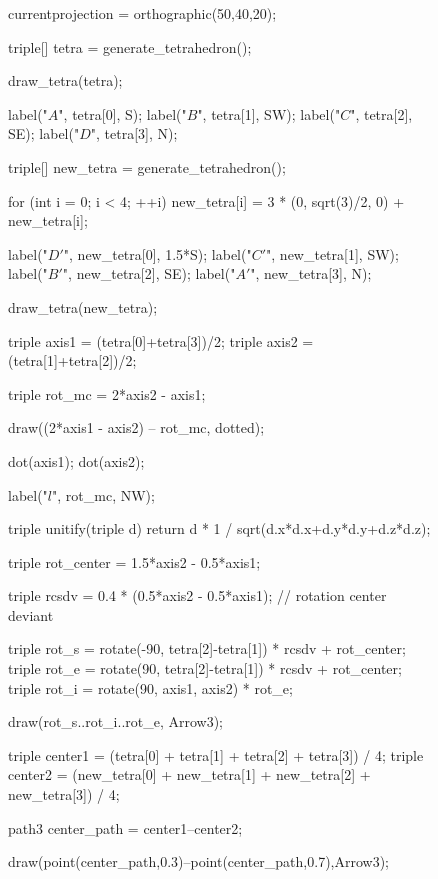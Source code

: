 \documentclass[../key.tex]{subfiles}
\begin{document}
\begin{figure}[h]
	\begin{center}
		\begin{minipage}[b]{\textwidth}
			\centering
			\begin{asy}[width=0.5\textwidth]
			currentprojection = orthographic(50,40,20);
			
			triple[] tetra = generate_tetrahedron();
			
			draw_tetra(tetra);
			
			label("$A$", tetra[0], S);
			label("$B$", tetra[1], SW);
			label("$C$", tetra[2], SE);
			label("$D$", tetra[3], N);
			
			triple[] new_tetra = generate_tetrahedron();
			
			for (int i = 0; i < 4; ++i) new_tetra[i] = 3 * (0, sqrt(3)/2, 0) + new_tetra[i];
			
			label("$D'$", new_tetra[0], 1.5*S);
			label("$C'$", new_tetra[1], SW);
			label("$B'$", new_tetra[2], SE);
			label("$A'$", new_tetra[3], N);
			
			draw_tetra(new_tetra);
			
			triple axis1 = (tetra[0]+tetra[3])/2;
			triple axis2 = (tetra[1]+tetra[2])/2;
			
			triple rot_mc = 2*axis2 - axis1;
			
			draw((2*axis1 - axis2) -- rot_mc, dotted);
			
			dot(axis1);
			dot(axis2);
			
			label("$l$", rot_mc, NW);
			
			triple unitify(triple d) {
				return d * 1 / sqrt(d.x*d.x+d.y*d.y+d.z*d.z);
			}
			
			triple rot_center = 1.5*axis2 - 0.5*axis1;
			
			triple rcsdv = 0.4 * (0.5*axis2 - 0.5*axis1); // rotation center deviant
			
			triple rot_s = rotate(-90, tetra[2]-tetra[1]) * rcsdv + rot_center;
			triple rot_e = rotate(90, tetra[2]-tetra[1]) * rcsdv + rot_center;
			triple rot_i = rotate(90, axis1, axis2) * rot_e;
			
			draw(rot_s..rot_i..rot_e, Arrow3);
			
			
			triple center1 = (tetra[0] + tetra[1] + tetra[2] + tetra[3]) / 4;
			triple center2 = (new_tetra[0] + new_tetra[1] + new_tetra[2] + new_tetra[3]) / 4;
			
			path3 center_path = center1--center2;
			
			draw(point(center_path,0.3)--point(center_path,0.7),Arrow3);
			

\end{asy}
\end{minipage}
\end{center}
\end{figure}
\end{document}
